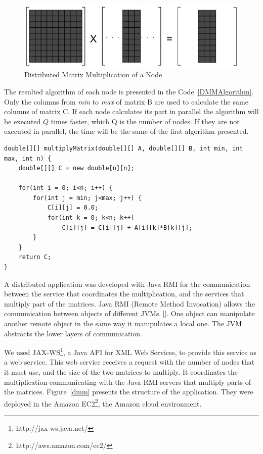 \begin{figure}[htbp]
\begin{center}
	\includegraphics[scale=0.5]{images/matrices}
\caption{Distributed Matrix Multiplication of a Node}
\label{matrices}
\end{center}
\end{figure}

The resulted algorithm of each node is presented in the Code~\ref{DMMAlgorithm}. Only the columns from \emph{min} to \emph{max} of matrix B are used to calculate the same columns of matrix C. If each node calculates its part in parallel the algorithm will be executed $Q$ times faster, which Q is the number of nodes. If they are not executed in parallel, the time will be the same of the first algorithm presented.
\clearpage

\begin{lstlisting}
double[][] multiplyMatrix(double[][] A, double[][] B, int min, int max, int n) {
	double[][] C = new double[n][n];
	
	for(int i = 0; i<n; i++) {
		for(int j = min; j<max; j++) {
			C[i][j] = 0.0;
			for(int k = 0; k<n; k++)
				C[i][j] = C[i][j] + A[i][k]*B[k][j];
		}
	}
	return C;
}
\end{lstlisting}

A distributed application was developed with Java RMI for the communication between the service that coordinates the multiplication, and the services that multiply part of the matrices. Java RMI (Remote Method Invocation) allows the communication between objects of different JVMs~[\cite{JavaRMI}]. One object can manipulate another remote object in the same way it manipulates a local one. The JVM abstracts the lower layers of communication.

We used JAX-WS\footnote{http://jax-ws.java.net/}, a Java API for XML Web Services, to provide this service as a web service.  This web service receives a request with the number of nodes that it must use, and the size of the two matrices to multiply. It coordinates the multiplication communicating with the Java RMI servers that multiply parts of the matrices. Figure~\ref{dmm} presents the structure of the application. They were deployed in the Amazon EC2\footnote{http://aws.amazon.com/ec2/}, the Amazon cloud environment.

